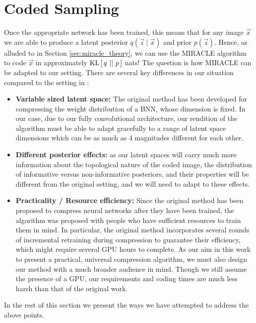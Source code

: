 \section{Coded Sampling}
\label{sec:coded_sampling}
\par
Once the appropriate network has been trained, this means that for any image $\vec{x}$
we are able to produce a latent posterior $q(\vec{z} \mid \vec{x})$ and prior
$p(\vec{z})$. Hence, as alluded to in Section \ref{sec:miracle_theory}, we can
use the MIRACLE algorithm to code $\vec{x}$ in approximately $\mathrm{KL}\left[\,q\,\,||\,\,p\,\right]$ nats!
The question is how MIRACLE can be adapted to our setting. There are several key
differences in our situation compared to the setting in
\cite{havasi2018minimal}:

\begin{itemize}
\item \textbf{Variable sized latent space:} The original method has been
  developed for compressing the weight distribution of a BNN, whose dimension is
  fixed. In our case, due to our fully convolutional architecture, our rendition
  of the algorithm must be able to adapt gracefully to a range of latent space
  dimensions which can be as much as 4 magnitudes different for each other.

\item \textbf{Different posterior effects:} as our latent spaces will carry much
  more information about the topological nature of the coded image, the
  distribution of informative versus non-informative posteriors, and their
  properties will be different from the original setting, and we will need to
  adapt to these effects.

\item \textbf{Practicality / Resource efficiency:} Since the original method has
  been proposed to compress neural networks after they have been trained, the
  algorithm was proposed with people who have sufficient resources to train them
  in mind. In particular, the original method incorporates several rounds of
  incremental retraining during compression to guarantee their efficiency, which
  might require several GPU hours to complete. As our aim in this work to
  present a practical, universal compression algorithm, we must also design our
  method with a much broader audience in mind. Though we still assume the
  presence of a GPU, our requirements and coding times are much less harsh than
  that of the original work.
\end{itemize}

In the rest of this section we present the ways we have attempted to address the
above points.

